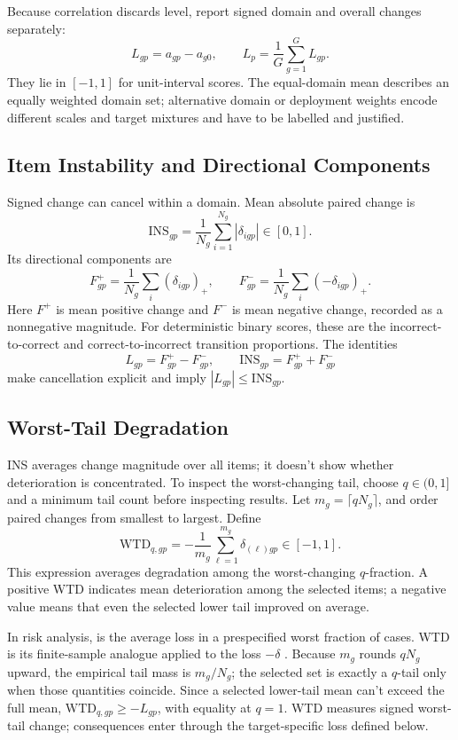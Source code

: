 \documentclass[12pt]{article}
\newcommand{\ins}{\mathrm{INS}}
\newcommand{\wtd}{\mathrm{WTD}}
\begin{document}
Because correlation discards level, report signed domain and overall changes separately:
\[
L_{gp}=a_{gp}-a_{g0},
\qquad
L_p=\frac{1}{G}\sum_{g=1}^{G}L_{gp}.
\]
They lie in \([-1,1]\) for unit-interval scores. The equal-domain mean describes an equally weighted domain set; alternative domain or deployment weights encode different scales and target mixtures and have to be labelled and justified.

\subsection{Item Instability and Directional Components}\label{ssec:item_instability}

Signed change can cancel within a domain. Mean absolute paired change is
\begin{equation}\label{eq:ins}
\ins_{gp}=\frac{1}{N_g}\sum_{i=1}^{N_g}|\delta_{igp}|\in[0,1].
\end{equation}
Its directional components are
\[
F^+_{gp}=\frac{1}{N_g}\sum_i(\delta_{igp})_+,
\qquad
F^-_{gp}=\frac{1}{N_g}\sum_i(-\delta_{igp})_+.
\]
Here \(F^+\) is mean positive change and \(F^-\) is mean negative change, recorded as a nonnegative magnitude. For deterministic binary scores, these are the incorrect-to-correct and correct-to-incorrect transition proportions. The identities
\[
L_{gp}=F^+_{gp}-F^-_{gp},
\qquad
\ins_{gp}=F^+_{gp}+F^-_{gp}
\]
make cancellation explicit and imply \(|L_{gp}|\leq\ins_{gp}\).

\subsection{Worst-Tail Degradation}\label{ssec:wtd}

INS averages change magnitude over all items; it doesn't show whether deterioration is concentrated. To inspect the worst-changing tail, choose \(q\in(0,1]\) and a minimum tail count before inspecting results. Let \(m_g=\lceil qN_g\rceil\), and order paired changes from smallest to largest. Define
\begin{equation}\label{eq:wtd}
\wtd_{q,gp}
=-\frac{1}{m_g}\sum_{\ell=1}^{m_g}\delta_{(\ell)gp}
\in[-1,1].
\end{equation}
This expression averages degradation among the worst-changing \(q\)-fraction. A positive WTD indicates mean deterioration among the selected items; a negative value means that even the selected lower tail improved on average.

In risk analysis,  is the average loss in a prespecified worst fraction of cases. WTD is its finite-sample analogue applied to the loss \(-\delta\) \citep{acerbiTasche2002expectedShortfall,rockafellarUryasev2002cvar}. Because \(m_g\) rounds \(qN_g\) upward, the empirical tail mass is \(m_g/N_g\); the selected set is exactly a \(q\)-tail only when those quantities coincide. Since a selected lower-tail mean can't exceed the full mean, \(\wtd_{q,gp}\geq-L_{gp}\), with equality at \(q=1\). WTD measures signed worst-tail change; consequences enter through the target-specific loss defined below.
\end{document}

